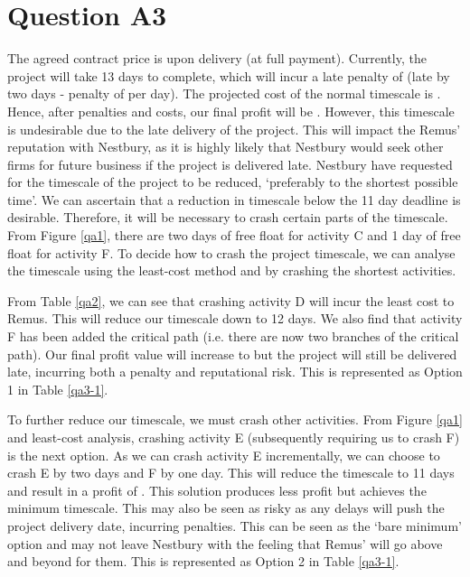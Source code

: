 \documentclass[11pt]{article}
\begin{document}
\section*{Question A3}
The agreed contract price is \Pounds[52000] upon delivery (at full payment). Currently, the project will take 13 days to complete, which will incur a late penalty of \Pounds[5000] (late by two days - penalty of \Pounds[2500] per day). The projected cost of the normal timescale is \Pounds[28000]. Hence, after penalties and costs, our final profit will be \Pounds[19000]. However, this timescale is undesirable due to the late delivery of the project. This will impact the Remus' reputation with Nestbury, as it is highly likely that Nestbury would seek other firms for future business if the project is delivered late. Nestbury have requested for the timescale of the project to be reduced, `preferably to the shortest possible time'. We can ascertain that a reduction in timescale below the 11 day deadline is desirable. Therefore, it will be necessary to crash certain parts of the timescale. From Figure \ref{qa1}, there are two days of free float for activity C and 1 day of free float for activity F. To decide how to crash the project timescale, we can analyse the timescale using the least-cost method and by crashing the shortest activities.

From Table \ref{qa2}, we can see that crashing activity D will incur the least cost to Remus. This will reduce our timescale down to 12 days. We also find that activity F has been added the critical path (i.e. there are now two branches of the critical path). Our final profit value will increase to \Pounds[20500] but the project will still be delivered late, incurring both a penalty and reputational risk. This is represented as Option 1 in Table \ref{qa3-1}.

To further reduce our timescale, we must crash other activities. From Figure \ref{qa1} and least-cost analysis, crashing activity E (subsequently requiring us to crash F) is the next option. As we can crash activity E incrementally, we can choose to crash E by two days and F by one day. This will reduce the timescale to 11 days and result in a profit of \Pounds[19000]. This solution produces less profit but achieves the minimum timescale. This may also be seen as risky as any delays will push the project delivery date, incurring penalties. This can be seen as the `bare minimum' option and may not leave Nestbury with the feeling that Remus' will go above and beyond for them. This is represented as Option 2 in Table \ref{qa3-1}.
\end{document}
